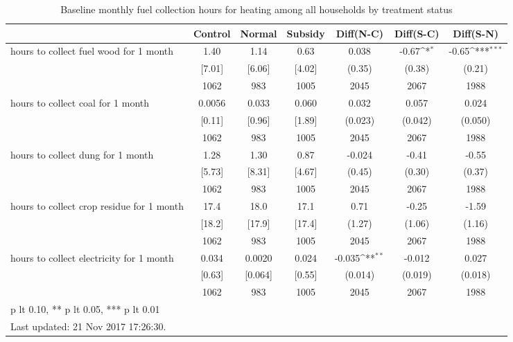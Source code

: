 \begin{table}[htbp]\centering
\def\sym#1{\ifmmode^{#1}\else\(^{#1}\)\fi}
\caption{Baseline monthly fuel collection hours for heating among all households by treatment status \label{tab:"balance"}}
\begin{tabular*}{1\hsize}{@{\hskip\tabcolsep\extracolsep\fill}l*{1}{cccccc}}
\toprule
                                &  Control&   Normal&  Subsidy&Diff(N-C)         &Diff(S-C)         &Diff(S-N)         \\
\midrule
hours to collect fuel wood for 1 month&     1.40&     1.14&     0.63&    0.038         &    -0.67\sym{*}  &    -0.65\sym{***}\\
                                &   [7.01]&   [6.06]&   [4.02]&   (0.35)         &   (0.38)         &   (0.21)         \\
                                &     1062&      983&     1005&     2045         &     2067         &     1988         \\
hours to collect coal for 1 month&   0.0056&    0.033&    0.060&    0.032         &    0.057         &    0.024         \\
                                &   [0.11]&   [0.96]&   [1.89]&  (0.023)         &  (0.042)         &  (0.050)         \\
                                &     1062&      983&     1005&     2045         &     2067         &     1988         \\
hours to collect dung for 1 month&     1.28&     1.30&     0.87&   -0.024         &    -0.41         &    -0.55         \\
                                &   [5.73]&   [8.31]&   [4.67]&   (0.45)         &   (0.30)         &   (0.37)         \\
                                &     1062&      983&     1005&     2045         &     2067         &     1988         \\
hours to collect crop residue for 1 month&     17.4&     18.0&     17.1&     0.71         &    -0.25         &    -1.59         \\
                                &   [18.2]&   [17.9]&   [17.4]&   (1.27)         &   (1.06)         &   (1.16)         \\
                                &     1062&      983&     1005&     2045         &     2067         &     1988         \\
hours to collect electricity for 1 month&    0.034&   0.0020&    0.024&   -0.035\sym{**} &   -0.012         &    0.027         \\
                                &   [0.63]&  [0.064]&   [0.55]&  (0.014)         &  (0.019)         &  (0.018)         \\
                                &     1062&      983&     1005&     2045         &     2067         &     1988         \\
\bottomrule
\multicolumn{7}{l}{\footnotesize * p lt 0.10, ** p lt 0.05, *** p lt 0.01}\\
\multicolumn{7}{l}{\footnotesize Last updated: 21 Nov 2017 17:26:30.}\\
\end{tabular*}
\end{table}
